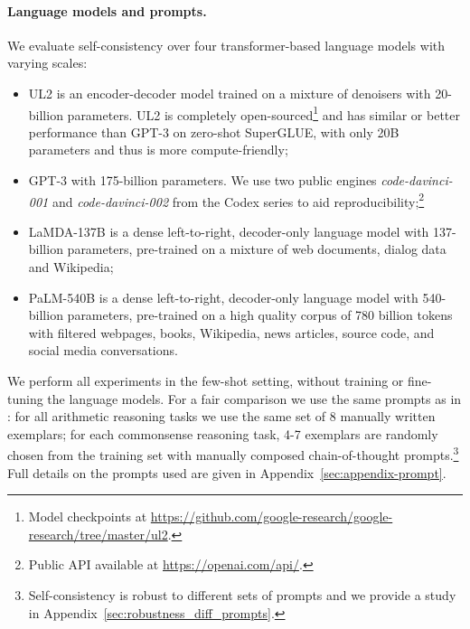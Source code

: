 \documentclass{article} %
\begin{document}
\vspace{-0.1in}
\paragraph{Language models and prompts.}
We evaluate self-consistency over four transformer-based language models with varying scales: 
\begin{itemize}[leftmargin=0.6cm]
\vspace{-0.05in}
    \item UL2 \citep{ul2} is an encoder-decoder model trained on a mixture of denoisers with 20-billion parameters. UL2 is completely open-sourced\footnote{Model checkpoints at \scriptsize{\url{https://github.com/google-research/google-research/tree/master/ul2}}.} and has similar or better performance than GPT-3 on zero-shot SuperGLUE, with only 20B parameters and thus is more compute-friendly;
    \item GPT-3 \citep{brown2020language} with 175-billion parameters. We use two public engines \textit{code-davinci-001} and \textit{code-davinci-002} from the Codex series \citep{chen2021evaluating} to aid reproducibility;\footnote{Public API available at \scriptsize{\url{https://openai.com/api/}.}}
    \item LaMDA-137B \citep{thoppilan2022lamda} is a dense left-to-right, decoder-only language model with 137-billion parameters, pre-trained on a mixture of web documents, dialog data and
Wikipedia; 
\item PaLM-540B \citep{palm} is a dense left-to-right, decoder-only language model with 540-billion parameters, pre-trained on a high quality corpus of 780 billion tokens with filtered webpages, books, Wikipedia, news articles, source
code, and social media conversations.
\end{itemize}

\vspace{-0.1in}
We perform all experiments in the few-shot setting, without training or fine-tuning the language models. 
For a fair comparison we use the same prompts as in \citet{wei2022chain}: for all arithmetic reasoning tasks we use the same set of 8 manually written exemplars; for each commonsense reasoning task, 4-7 exemplars are randomly chosen from the training set with manually composed chain-of-thought prompts.\footnote{Self-consistency is robust to different sets of prompts and we provide a study in Appendix~\ref{sec:robustness_diff_prompts}.}
Full details on the prompts used are given in Appendix~\ref{sec:appendix-prompt}.
\end{document}
